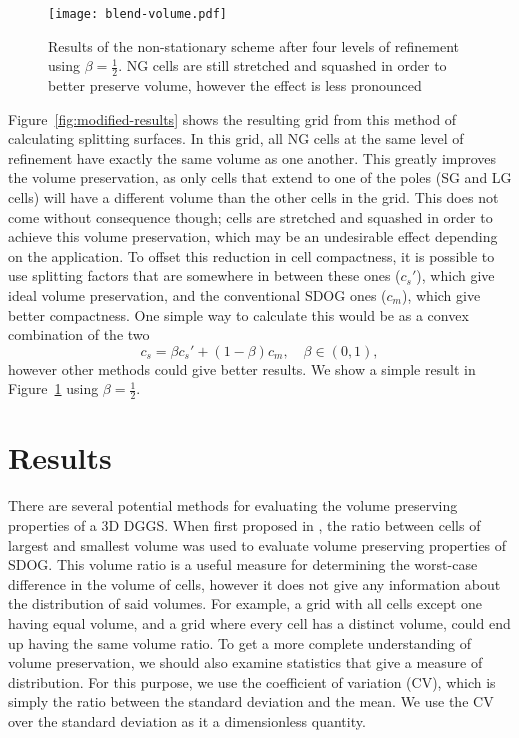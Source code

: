 \begin{figure}[tb]
	\texttt{[image: blend-volume.pdf]}
	\caption[Title]{
		Results of the non-stationary scheme after four levels of refinement using $\beta = \frac{1}{2}$.
		NG cells are still stretched and squashed in order to better preserve volume, however the effect is less pronounced
	}
	\label{fig:blend-volume}
\end{figure}


Figure~\ref{fig:modified-results} shows the resulting grid from this method of calculating splitting surfaces.
In this grid, all NG cells at the same level of refinement have exactly the same volume as one another.
This greatly improves the volume preservation, as only cells that extend to one of the poles (SG and LG cells) will have a different volume than the other cells in the grid.
This does not come without consequence though; cells are stretched and squashed in order to achieve this volume preservation, which may be an undesirable effect depending on the application.
To offset this reduction in cell compactness, it is possible to use splitting factors that are somewhere in between these ones ($c_{s}'$), which give ideal volume preservation, and the conventional SDOG ones ($c_{m}$), which give better compactness.
One simple way to calculate this would be as a convex combination of the two
%
\begin{equation}
c_{s} = \beta c_{s}' + \left( 1 - \beta \right)c_{m}, \quad \beta \in \left( 0,1 \right),
\label {eq:beta}
\end{equation}
%
however other methods could give better results.
We show a simple result in Figure~\ref{fig:blend-volume} using $\beta = \frac{1}{2}$.

\section{Results}
There are several potential methods for evaluating the volume preserving properties of a 3D DGGS.
When first proposed in \cite{yu2009sdog}, the ratio between cells of largest and smallest volume was used to evaluate volume preserving properties of SDOG.
This volume ratio is a useful measure for determining the worst-case difference in the volume of cells, however it does not give any information about the distribution of said volumes.
For example, a grid with all cells except one having equal volume, and a grid where every cell has a distinct volume, could end up having the same volume ratio.
To get a more complete understanding of volume preservation, we should also examine statistics that give a measure of distribution.
For this purpose, we use the coefficient of variation (CV), which is simply the ratio between the standard deviation and the mean.
We use the CV over the standard deviation as it a dimensionless quantity.


